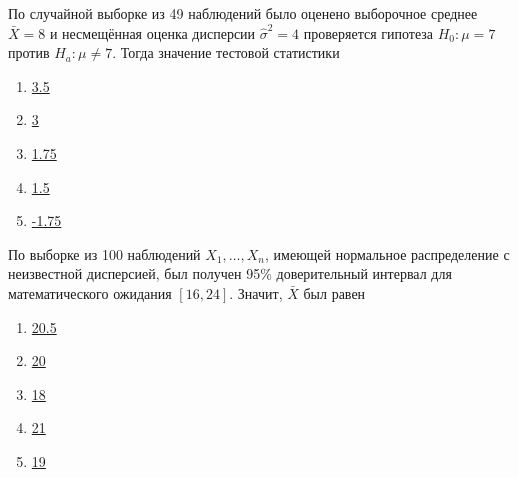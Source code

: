 \documentclass[t]{beamer}
\begin{document}
 \begin{frame} \label{34} 
\begin{block}{34} 

  По случайной выборке из 49 наблюдений было оценено выборочное среднее $\bar{X} = 8$  и несмещённая оценка дисперсии $\hat{\sigma}^2 = 4$ проверяется гипотеза $H_0: \mu = 7$ против $H_a: \mu \ne 7$. Тогда значение тестовой статистики


 \end{block} 
\begin{enumerate} 
\item[] \hyperlink{34-Yes}{\beamergotobutton{} 3.5}
\item[] \hyperlink{34-No}{\beamergotobutton{} 3}
\item[] \hyperlink{34-No}{\beamergotobutton{} 1.75}
\item[] \hyperlink{34-No}{\beamergotobutton{} 1.5}
\item[] \hyperlink{34-No}{\beamergotobutton{} -1.75}
\end{enumerate} 
\end{frame} 


 \begin{frame} \label{35} 
\begin{block}{35} 

  По выборке из 100 наблюдений $X_1,\ldots,X_{n}$, имеющей нормальное распределение с неизвестной дисперсией, был получен 95\% доверительный интервал для математического ожидания $[16,24]$. Значит, $\bar{X}$ был равен


 \end{block} 
\begin{enumerate} 
\item[] \hyperlink{35-No}{\beamergotobutton{} 20.5}
\item[] \hyperlink{35-Yes}{\beamergotobutton{} 20}
\item[] \hyperlink{35-No}{\beamergotobutton{} 18}
\item[] \hyperlink{35-No}{\beamergotobutton{} 21}
\item[] \hyperlink{35-No}{\beamergotobutton{} 19}
\end{enumerate} 
\end{frame} 
\end{document}
